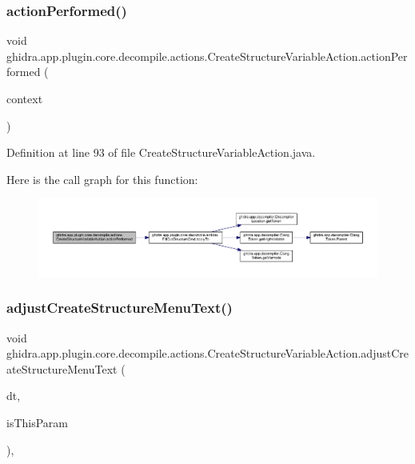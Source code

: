 \subsubsection{\texorpdfstring{actionPerformed()}{actionPerformed()}}
{\footnotesize\ttfamily void ghidra.\+app.\+plugin.\+core.\+decompile.\+actions.\+Create\+Structure\+Variable\+Action.\+action\+Performed (\begin{DoxyParamCaption}\item[{Action\+Context}]{context }\end{DoxyParamCaption})\hspace{0.3cm}{\ttfamily [inline]}}



Definition at line 93 of file Create\+Structure\+Variable\+Action.\+java.

Here is the call graph for this function\+:
\nopagebreak
\begin{figure}[H]
\begin{center}
\leavevmode
\includegraphics[width=350pt]{classghidra_1_1app_1_1plugin_1_1core_1_1decompile_1_1actions_1_1_create_structure_variable_action_a2f38da4ca96ff96fa7b34ac4fc66d2ba_cgraph}
\end{center}
\end{figure}
\mbox{\label{classghidra_1_1app_1_1plugin_1_1core_1_1decompile_1_1actions_1_1_create_structure_variable_action_ad5aad5b060b0994438c70aca92573b19}} 
\subsubsection{\texorpdfstring{adjustCreateStructureMenuText()}{adjustCreateStructureMenuText()}}
{\footnotesize\ttfamily void ghidra.\+app.\+plugin.\+core.\+decompile.\+actions.\+Create\+Structure\+Variable\+Action.\+adjust\+Create\+Structure\+Menu\+Text (\begin{DoxyParamCaption}\item[{Data\+Type}]{dt,  }\item[{boolean}]{is\+This\+Param }\end{DoxyParamCaption})\hspace{0.3cm}{\ttfamily [inline]}, {\ttfamily [protected]}}

